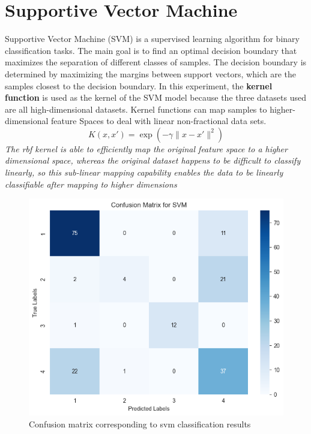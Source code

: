 \documentclass[twocolumn]{IEEEtran}
\begin{document}
\section{Supportive Vector Machine}
Supportive Vector Machine (SVM) is a supervised learning algorithm for binary classification tasks. The main goal is to find an optimal decision boundary that maximizes the separation of different classes of samples. The decision boundary is determined by maximizing the margins between support vectors, which are the samples closest to the decision boundary. In this experiment, the \textbf{kernel function} is used as the kernel of the SVM model because the three datasets used are all high-dimensional datasets. Kernel functions can map samples to higher-dimensional feature Spaces to deal with linear non-fractional data sets.
\begin{equation}
    K(x, x') = \exp\left(-\gamma \|x - x'\|^2\right)
\end{equation}
\textit{The rbf kernel is able to efficiently map the original feature space to a higher dimensional space, whereas the original dataset happens to be difficult to classify linearly, so this sub-linear mapping capability enables the data to be linearly classifiable after mapping to higher dimensions}
\begin{figure}[H]
    \centering %
    \includegraphics[scale=0.3]{./img/svm_matrix.png}
    \caption{Confusion matrix corresponding to svm classification results}
\end{figure}
\end{document}

